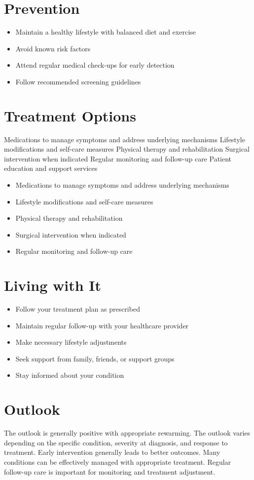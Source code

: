 \section{Prevention}
\begin{itemize}[noitemsep]
  \item Maintain a healthy lifestyle with balanced diet and exercise
  \item Avoid known risk factors
  \item Attend regular medical check-ups for early detection
  \item Follow recommended screening guidelines
\end{itemize}
\section{Treatment Options}
Medications to manage symptoms and address underlying mechanisms Lifestyle modifications and self-care measures Physical therapy and rehabilitation Surgical intervention when indicated Regular monitoring and follow-up care Patient education and support services

\begin{itemize}[noitemsep]
  \item Medications to manage symptoms and address underlying mechanisms
  \item Lifestyle modifications and self-care measures
  \item Physical therapy and rehabilitation
  \item Surgical intervention when indicated
  \item Regular monitoring and follow-up care
\end{itemize}
\section{Living with It}
\begin{itemize}[noitemsep]
  \item Follow your treatment plan as prescribed
  \item Maintain regular follow-up with your healthcare provider
  \item Make necessary lifestyle adjustments
  \item Seek support from family, friends, or support groups
  \item Stay informed about your condition
\end{itemize}
\section{Outlook}
The outlook is generally positive with appropriate rewarming. The outlook varies depending on the specific condition, severity at diagnosis, and response to treatment. Early intervention generally leads to better outcomes. Many conditions can be effectively managed with appropriate treatment. Regular follow-up care is important for monitoring and treatment adjustment.
